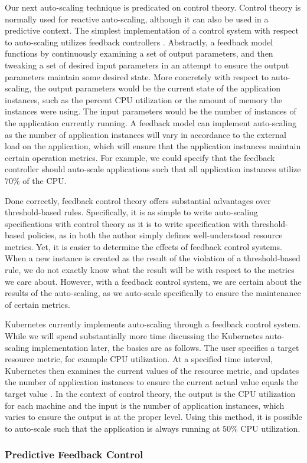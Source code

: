 Our next auto-scaling technique is predicated on control
theory. Control theory is normally used for reactive auto-scaling, although it
can also be used in a predictive context. The simplest implementation of a
control system with respect to auto-scaling utilizes feedback
controllers
\cite{auto-scaling-techniques-for-elastic-applications-in-cloud-environments}.
Abstractly, a feedback model functions by continuously examining a set of output parameters,
and then tweaking a set of desired input parameters in an attempt to ensure the
output parameters maintain some desired state. More concretely with respect to
auto-scaling, the output parameters would be the current state of the
application instances, such as the percent CPU utilization or the amount of
memory the instances were using. The input parameters would be the
number of instances of the application currently running. A feedback model
can implement auto-scaling as the number of application instances will vary in
accordance to the external load on the application, which will ensure that the
application instances maintain certain operation metrics. For example, we could
specify that the feedback controller should auto-scale applications such that
all application instances utilize $70\%$ of the CPU.

Done correctly, feedback control theory offers substantial advantages over
threshold-based rules. Specifically, it is as simple to write auto-scaling
specifications with control theory as it is to write specification with
threshold-based policies, as in both the author simply defines well-understood
resource metrics. Yet, it is easier to determine the effects of feedback
control systems. When a new instance is created as the result of the violation
of a threshold-based rule, we do not exactly know what the result will be with
respect to the metrics we care about. However, with a feedback control system,
we are certain about the results of the auto-scaling, as we auto-scale
specifically to ensure the maintenance of certain metrics.

Kubernetes currently implements auto-scaling through a feedback control system.
While we will spend substantially more time discussing the Kubernetes auto-scaling
implementation later, the basics are as follows. The user specifies a target resource
metric, for example CPU utilization. At a specified time interval,
Kubernetes then examines the current values
of the resource metric, and updates the number of application instances to
ensure the current actual value equals the target
value \cite{k8s-horizontal-pod-autoscaler-proposal}. In the context of control
theory, the output is the CPU utilization for each machine and the input is the
number of application instances, which varies to ensure the output is at the
proper level. Using this method, it is possible to auto-scale such that the
application is always running at $50\%$ CPU utilization.

\subsubsection{Predictive Feedback Control}


